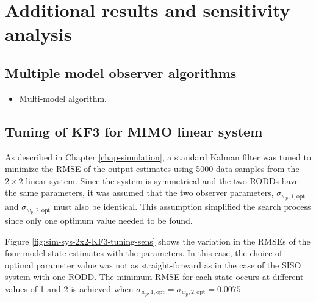 \chapter{Additional results and sensitivity analysis}     %
\label{chap-Annex}                   %

\section{Multiple model observer algorithms}

\begin{itemize}
	\item Multi-model algorithm.
\end{itemize}

\section{Tuning of KF3 for MIMO linear system} \label{section:annex-sim-2-KF-tuning}

As described in Chapter \ref{chap-simulation}, a standard Kalman filter was tuned to minimize the RMSE of the output estimates using 5000 data samples from the $2\times2$ linear system. Since the system is symmetrical and the two RODDs have the same parameters, it was assumed that the two observer parameters, $\sigma_{w_p,1,\text{opt}}$ and $\sigma_{w_p,2,\text{opt}}$ must also be identical. This assumption simplified the search process since only one optimum value needed to be found.

Figure \ref{fig:sim-sys-2x2-KF3-tuning-sens} shows the variation in the RMSEs of the four model state estimates with the parameters. In this case, the choice of optimal parameter value was not as straight-forward as in the case of the SISO system with one RODD. The minimum RMSE for each state occurs at different values of  1 and 2 is achieved when $\sigma_{w_p,1,\text{opt}}=\sigma_{w_p,2,\text{opt}}=0.0075$

